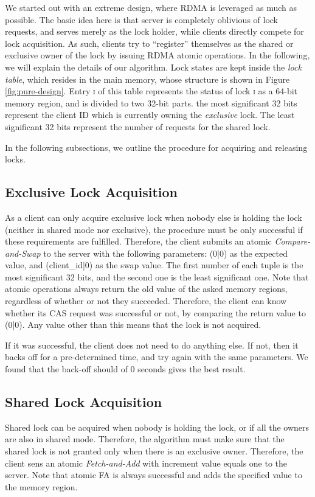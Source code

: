 \documentclass[twoside]{article}
\begin{document}
\begin{multicols}{2}
We started out with an extreme design, where RDMA is leveraged as much as possible.
The basic idea here is that server is completely oblivious of lock requests, and serves merely as the lock holder, while clients directly compete for lock acquisition.
As such, clients try to ``register'' themselves as the shared or exclusive owner of the lock by issuing RDMA atomic operations.
In the following, we will explain the details of our algorithm.
Lock states are kept inside the \emph{lock table}, which resides in the main memory, whose structure is shown in Figure \ref{fig:pure-design}.
Entry \textsc{i} of this table represents the status of lock \textsc{i} as a 64-bit memory region, and is divided to two 32-bit parts.
the most significant 32 bits represent the client ID which is currently owning the \emph{exclusive} lock. 
The least significant 32 bits represent the number of requests for the shared lock.

In the following subsections, we outline the procedure for acquiring and releasing locks.

\subsection{Exclusive Lock Acquisition}
As a client can only acquire exclusive lock when nobody else is holding the lock (neither in shared mode nor exclusive), the procedure must be only successful if these requirements are fulfilled.
Therefore, the client submits an atomic \emph{Compare-and-Swap} to the server with the following parameters: (0|0) as the expected value, and (client\_id|0) as the swap value.
The first number of each tuple is the most significant 32 bits, and the second one is the least significant one.
Note that atomic operations always return the old value of the asked memory regions, regardless of whether or not they succeeded.
Therefore, the client can know whether its CAS request was successful or not, by comparing the return value to (0|0).
Any value other than this means that the lock is not acquired.

If it was successful, the client does not need to do anything else.
If not, then it backs off for a pre-determined time, and try again with the same parameters.
We found that the back-off should of 0 seconds gives the best result.

\subsection{Shared Lock Acquisition}
\label{pure:shared_acquisition}
Shared lock can be acquired when nobody is holding the lock, or if all the owners are also in shared mode.
Therefore, the algorithm must make sure that the shared lock is not granted only when there is an exclusive owner.
Therefore, the client sens an atomic \emph{Fetch-and-Add} with increment value equals one to the server.
Note that atomic FA is always successful and adds the specified value to the memory region.


\end{multicols}
\end{document}
